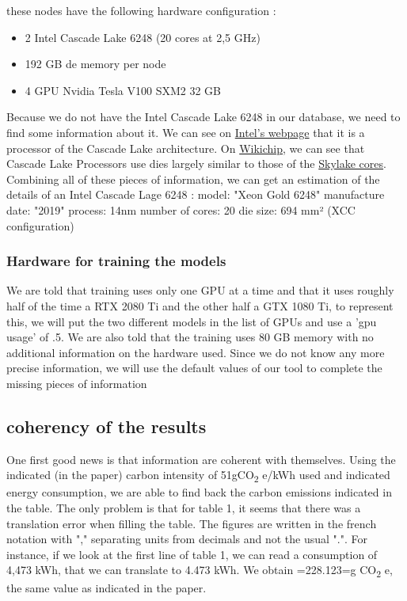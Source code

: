 \documentclass[11pt]{article}
\begin{document}
these nodes have the following hardware configuration :
\begin{itemize}
\item 2 Intel Cascade Lake 6248 (20 cores at 2,5 GHz)
\item 192 GB de memory per node
\item 4 GPU Nvidia Tesla V100 SXM2 32 GB
\end{itemize}

Because we do not have the Intel Cascade Lake 6248 in our database, we
need to find some information about it. We can see on \href{https://www.intel.fr/content/www/fr/fr/products/sku/192446/intel-xeon-gold-6248-processor-27-5m-cache-2-50-ghz/specifications.html}{Intel's webpage}
that it is a processor of the Cascade Lake architecture. On \href{https://en.wikichip.org/wiki/intel/microarchitectures/cascade\_lake\#LCC\_SoC}{Wikichip},
we can see that Cascade Lake Processors use dies largely similar to
those of the \href{https://en.wikichip.org/wiki/intel/microarchitectures/skylake\_(server)\#Core}{Skylake cores}. Combining all of these pieces of
information, we can get an estimation of the details of an Intel
Cascade Lage 6248 :
model: "Xeon Gold 6248"
manufacture date: "2019"
process: 14nm
number of cores: 20
die size: 694 mm² (XCC configuration)

\subsubsection{Hardware for training the models}
\label{sec:org5f0403f}

We are told that training uses only one GPU at a time and that it uses
roughly half of the time a RTX 2080 Ti and the other half a GTX 1080
Ti, to represent this, we will put the two different models in the
list of GPUs and use a 'gpu usage' of .5.
We are also told that the training uses 80 GB memory with no
additional information on the hardware used.
Since we do not know any more precise information, we will use the
default values of our tool to complete the missing pieces of information

\subsection{coherency of the results}
\label{sec:org6ac472c}

One first good news is that information are coherent with themselves.
Using the indicated (in the paper) carbon intensity of 51gCO\textsubscript{2} e/kWh
used and indicated energy consumption, we are able to find back the carbon emissions
indicated in the table. The only problem is that for table 1, it seems
that there was a translation error when filling the table. The figures
are written in the french notation with "," separating units from
decimals and not the usual ".".
For instance, if we look at the first line of table 1, we can read
a consumption of 4,473 kWh, that we can translate to 4.473 kWh.
We obtain =228.123=g CO\textsubscript{2} e, the same value as indicated in the paper.
\end{document}
